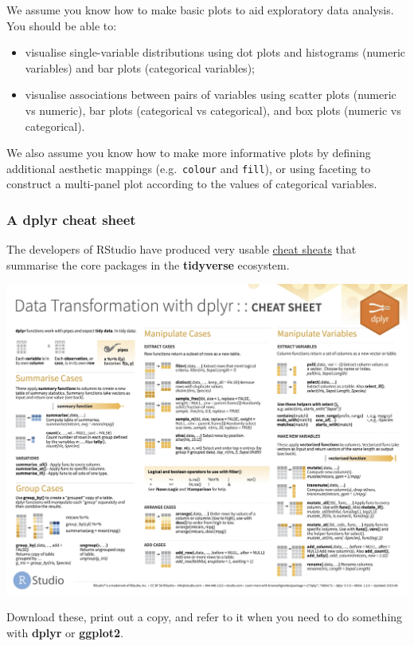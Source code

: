 \documentclass[
]{book}
\providecommand{\tightlist}{%
  \setlength{\itemsep}{0pt}\setlength{\parskip}{0pt}}
\newenvironment{greybox}{
  \definecolor{shadecolor}{rgb}{0.95,0.95,0.95}  %
  \color{black}
  \begin{shaded}}
 {\end{shaded}}
\newenvironment{infobox}[1]
  {
  \begin{itemize}
  \renewcommand{\labelitemi}{
    \raisebox{-.7\height}[0pt][0pt]{
      {\setkeys{Gin}{width=3em,keepaspectratio}
        \texttt{[image: images/\#1]}}
    }
  }
  \setlength{\fboxsep}{1em}
  \begin{greybox}
  \item
  }
  {
  \end{greybox}
  \end{itemize}
  }
\begin{document}
We assume you know how to make basic plots to aid exploratory data analysis. You should be able to:

\begin{itemize}
\tightlist
\item
  visualise single-variable distributions using dot plots and histograms (numeric variables) and bar plots (categorical variables);
\item
  visualise associations between pairs of variables using scatter plots (numeric vs numeric), bar plots (categorical vs categorical), and box plots (numeric vs categorical).
\end{itemize}

We also assume you know how to make more informative plots by defining additional aesthetic mappings (e.g.~\texttt{colour} and \texttt{fill}), or using faceting to construct a multi-panel plot according to the values of categorical variables.

\begin{infobox}{information}

\hypertarget{a-dplyr-cheat-sheet}{%
\subsubsection*{\texorpdfstring{A \textbf{dplyr} cheat sheet}{A dplyr cheat sheet}}\label{a-dplyr-cheat-sheet}}

The developers of RStudio have produced very usable \href{http://www.rstudio.com/resources/cheatsheets/}{cheat sheats} that summarise the core packages in the \textbf{tidyverse} ecosystem.

\includegraphics{images/data-transformation.jpg}

Download these, print out a copy, and refer to it when you need to do something with \textbf{dplyr} or \textbf{ggplot2}.

\end{infobox}
\end{document}
